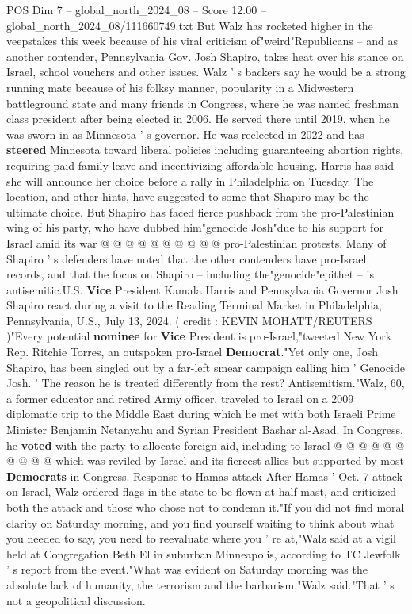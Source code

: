 \begin{textsample}{POS Dim 7 – global\_north\_2024\_08 – Score 12.00 – global\_north\_2024\_08/111660749.txt}  \label{ex:f7_pos_019}
But Walz has rocketed higher in the veepstakes this week because of his viral criticism of"weird"Republicans -- and as another contender, Pennsylvania Gov.
Josh Shapiro, takes heat over his stance on Israel, school vouchers and other issues.
Walz ' s backers say he would be a strong running mate because of his folksy manner, popularity in a Midwestern battleground state and many friends in Congress, where he was named freshman class president after being elected in 2006.
He served there until 2019, when he was sworn in as Minnesota ' s governor.
He was reelected in 2022 and has \textbf{steered} Minnesota toward liberal policies including guaranteeing abortion rights, requiring paid family leave and incentivizing affordable housing.
Harris has said she will announce her choice before a rally in Philadelphia on Tuesday.
The location, and other hints, have suggested to some that Shapiro may be the ultimate choice.
But Shapiro has faced fierce pushback from the pro-Palestinian wing of his party, who have dubbed him"genocide Josh"due to his support for Israel amid its war @ @ @ @ @ @ @ @ @ @ pro-Palestinian protests.
Many of Shapiro ' s defenders have noted that the other contenders have pro-Israel records, and that the focus on Shapiro -- including the"genocide"epithet -- is antisemitic.U.S. \textbf{Vice} President Kamala Harris and Pennsylvania Governor Josh Shapiro react during a visit to the Reading Terminal Market in Philadelphia, Pennsylvania, U.S., July 13, 2024. ( credit : KEVIN MOHATT/REUTERS )"Every potential \textbf{nominee} for \textbf{Vice} President is pro-Israel,"tweeted New York Rep.
Ritchie Torres, an outspoken pro-Israel \textbf{Democrat}."Yet only one, Josh Shapiro, has been singled out by a far-left smear campaign calling him ' Genocide Josh. ' The reason he is treated differently from the rest?
Antisemitism."Walz, 60, a former educator and retired Army officer, traveled to Israel on a 2009 diplomatic trip to the Middle East during which he met with both Israeli Prime Minister Benjamin Netanyahu and Syrian President Bashar al-Asad.
In Congress, he \textbf{voted} with the party to allocate foreign aid, including to Israel @ @ @ @ @ @ @ @ @ @ which was reviled by Israel and its fiercest allies but supported by most \textbf{Democrats} in Congress.
Response to Hamas attack After Hamas ' Oct. 7 attack on Israel, Walz ordered flags in the state to be flown at half-mast, and criticized both the attack and those who chose not to condemn it."If you did not find moral clarity on Saturday morning, and you find yourself waiting to think about what you needed to say, you need to reevaluate where you ' re at,"Walz said at a vigil held at Congregation Beth El in suburban Minneapolis, according to TC Jewfolk ' s report from the event."What was evident on Saturday morning was the absolute lack of humanity, the terrorism and the barbarism,"Walz said."That ' s not a geopolitical discussion.

\end{textsample}
